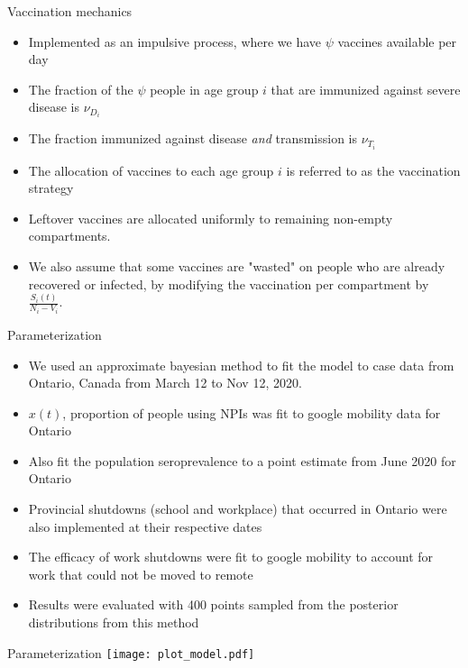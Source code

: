 \documentclass{beamer}
\begin{document}
\begin{frame}{Vaccination mechanics}
    \begin{itemize}
        \item Implemented as an impulsive process, where we have $\psi$ vaccines available per day
        \item The fraction of the $\psi$ people in age group $i$ that are immunized against severe disease is $\nu_{D_i}$
        \item The fraction immunized against disease \emph{and} transmission is $\nu_{T_i}$
        \item The allocation of vaccines to each age group $i$ is referred to as the vaccination strategy
        \item Leftover vaccines are allocated uniformly to remaining non-empty compartments.
        \item We also assume that some vaccines are "wasted" on people who are already recovered or infected, by modifying the vaccination per compartment by $\frac{S_i(t)}{N_i - V_i}$.
    \end{itemize}

\end{frame}


\begin{frame}{Parameterization}
    \begin{itemize}
        \item We used an approximate bayesian method to fit the model to case data from Ontario, Canada from March 12 to Nov 12, 2020.
        \item $x(t)$, proportion of people using NPIs was fit to google mobility data for Ontario
        \item Also fit the population seroprevalence to a point estimate from June 2020 for Ontario
        \item Provincial shutdowns (school and workplace) that occurred in Ontario were also implemented at their respective dates
        \item The efficacy of work shutdowns were fit to google mobility to account for work that could not be moved to remote
        \item Results were evaluated with 400 points sampled from the posterior distributions from this method 
    \end{itemize}
\end{frame}

\begin{frame}{Parameterization}
    \texttt{[image: plot\_model.pdf]}
\end{frame}
\end{document}
